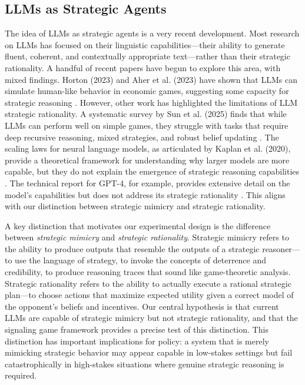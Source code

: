 \documentclass[12pt]{article}
\theoremstyle{plain}
\theoremstyle{definition}
\begin{document}
\subsection{LLMs as Strategic Agents}

The idea of LLMs as strategic agents is a very recent development. Most research on LLMs has focused on their linguistic capabilities---their ability to generate fluent, coherent, and contextually appropriate text---rather than their strategic rationality. A handful of recent papers have begun to explore this area, with mixed findings. Horton (2023) and Aher et al. (2023) have shown that LLMs can simulate human-like behavior in economic games, suggesting some capacity for strategic reasoning \citep{Horton2023, Aher2023}. However, other work has highlighted the limitations of LLM strategic rationality. A systematic survey by Sun et al. (2025) finds that while LLMs can perform well on simple games, they struggle with tasks that require deep recursive reasoning, mixed strategies, and robust belief updating \citep{Sun2025}. The scaling laws for neural language models, as articulated by Kaplan et al. (2020), provide a theoretical framework for understanding why larger models are more capable, but they do not explain the emergence of strategic reasoning capabilities \citep{Kaplan2020}. The technical report for GPT-4, for example, provides extensive detail on the model's capabilities but does not address its strategic rationality \citep{OpenAI2023}. This aligns with our distinction between strategic mimicry and strategic rationality.

A key distinction that motivates our experimental design is the difference between \textit{strategic mimicry} and \textit{strategic rationality}. Strategic mimicry refers to the ability to produce outputs that resemble the outputs of a strategic reasoner---to use the language of strategy, to invoke the concepts of deterrence and credibility, to produce reasoning traces that sound like game-theoretic analysis. Strategic rationality refers to the ability to actually execute a rational strategic plan---to choose actions that maximize expected utility given a correct model of the opponent's beliefs and incentives. Our central hypothesis is that current LLMs are capable of strategic mimicry but not strategic rationality, and that the signaling game framework provides a precise test of this distinction. This distinction has important implications for policy: a system that is merely mimicking strategic behavior may appear capable in low-stakes settings but fail catastrophically in high-stakes situations where genuine strategic reasoning is required.
\end{document}
